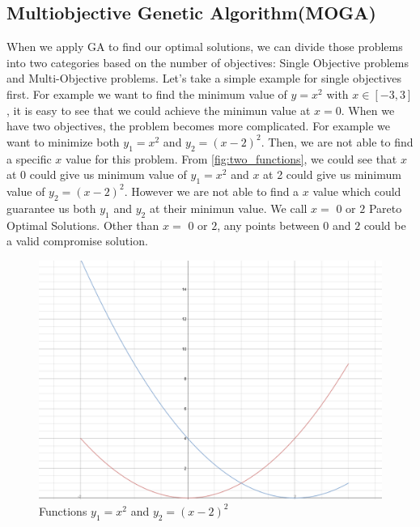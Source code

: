 \subsection{Multiobjective Genetic Algorithm(MOGA)}
When we apply GA to find our optimal solutions, we can divide those problems into two categories based on the number of objectives: Single Objective problems and Multi-Objective problems. Let's take a simple example for single objectives first. For example we want to find the minimum value of \(y=x^2\) with \(x\in [-3,3]\), it is easy to see that we could achieve the minimun value at \(x=0\). When we have two objectives, the problem becomes more complicated. For example we want to minimize both \(y_{1}=x^2\) and \(y_{2}=(x-2)^2\). Then, we are not able to find a specific \(x\) value for this problem. From \autoref{fig:two_functions}, we could see that \(x\) at 0 could give us minimum value of \(y_{1}=x^2\) and \(x\) at 2 could give us minimum value of \(y_{2}=(x-2)^2\). However we are not able to find a \(x\) value which could guarantee us both \(y_{1}\) and \(y_{2}\) at their minimun value. We call \(x=\) \(0\) or \(2\) Pareto Optimal Solutions\cite{Hans_1988_Multicriteria_Pareto_Optimal}\cite{Vira_1983_Multiobjective_Pareto_Optimal}. Other than \(x=\) \(0\) or \(2\), any points between \(0\) and \(2\) could be a valid compromise solution. 

\begin{figure}[htp] 
\centering
\includegraphics[scale=.2]{images/Figure_1.png}
\caption{Functions \(y_{1}=x^2\) and \(y_{2}=(x-2)^2\)}
\label{fig:two_functions}
\end{figure}

